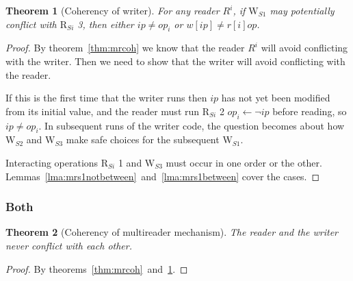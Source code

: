 \documentclass{article}
\newtheorem{thm}{Theorem}
\newtheorem{lemma}{Lemma}
\newcommand\paren[1]{\left({#1}\right)}
\newcommand\RS[1]{\ensuremath{\text{R}_{S#1}}}
\newcommand\WS[1]{\ensuremath{\text{W}_{S#1}}}
\newcommand\W[1]{\ensuremath{w\left[#1\right]}}
\newcommand\R[1]{\ensuremath{r\left[#1\right]}}
\newcommand\ip{\ensuremath{ip}}
\newcommand\op{\ensuremath{op}}
\newcommand\gneg[1]{\neg\paren{#1}}
\begin{document}
\begin{thm}[Coherency of writer]\label{thm:mwcoh}
  For any reader $R^i$, if \WS1 may potentially conflict with \RS i 3,
  then either $\ip\neq\op_i$ or $\W{\ip}\neq\R i {\op}$.
\end{thm}
\begin{proof}
  By theorem~\ref{thm:mrcoh} we know that the reader $R^i$ will avoid
  conflicting with the writer.  Then we need to show that the writer
  will avoid conflicting with the reader.

  If this is the first time that the writer runs then $\ip$ has not
  yet been modified from its initial value, and the reader must run
  \RS i 2 $\op_i\gets\neg\ip$ before reading, so $\ip\neq\op_i$. In
  subsequent runs of the writer code, the question becomes about how
  \WS2 and \WS3 make safe choices for the subsequent \WS1.

  Interacting operations \RS i 1 and \WS3 must occur in one order or the
  other. Lemmas~\ref{lma:mrs1notbetween}~and~\ref{lma:mrs1between} cover
  the cases.
\end{proof}

\subsubsection{Both}

\begin{thm}[Coherency of multireader mechanism]
  The reader and the writer never conflict with each other.
\end{thm}
\begin{proof}
  By theorems~\ref{thm:mrcoh}~and~\ref{thm:mwcoh}.
\end{proof}


\end{document}
